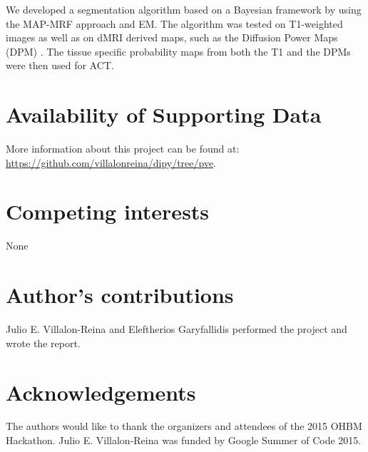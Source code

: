 \documentclass[twocolumn]{bmcart}%
\begin{document}
We developed a segmentation algorithm based on a Bayesian framework by
using the MAP-MRF approach and EM. The algorithm was tested on
T1-weighted images as well as on dMRI derived maps, such as the
Diffusion Power Maps (DPM) \cite{Dell2014}. The tissue specific
probability maps from both the T1 and the DPMs were then used for ACT.


\begin{backmatter}

\section*{Availability of Supporting Data}
More information about this project can be found at: \url{https://github.com/villalonreina/dipy/tree/pve}. 

\section*{Competing interests}
None

\section*{Author's contributions}
Julio E. Villalon-Reina and Eleftherios Garyfallidis performed the project and wrote the report.

\section*{Acknowledgements}
The authors would like to thank the organizers and attendees of the 2015
OHBM Hackathon. Julio E. Villalon-Reina was funded by Google Summer of Code 2015. 

  
  


\end{backmatter}
\end{document}
